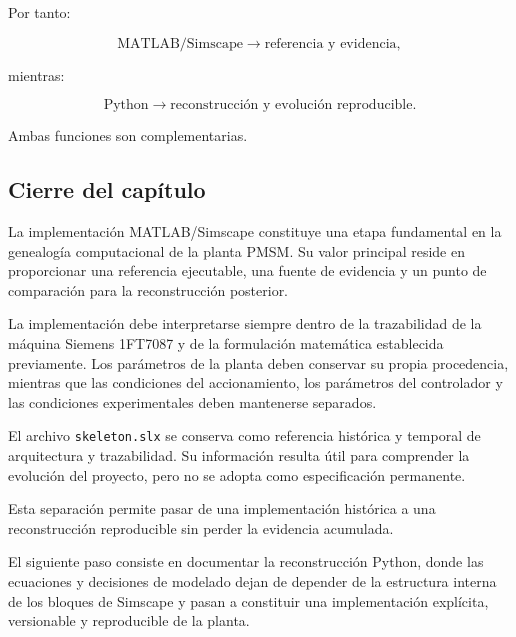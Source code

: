 Por tanto:

\begin{equation}
\text{MATLAB/Simscape}
\rightarrow
\text{referencia y evidencia},
\end{equation}

mientras:

\begin{equation}
\text{Python}
\rightarrow
\text{reconstrucción y evolución reproducible}.
\end{equation}

Ambas funciones son complementarias.

\subsection{Cierre del capítulo}

La implementación MATLAB/Simscape constituye una etapa fundamental en la genealogía computacional de la planta PMSM. Su valor principal reside en proporcionar una referencia ejecutable, una fuente de evidencia y un punto de comparación para la reconstrucción posterior.

La implementación debe interpretarse siempre dentro de la trazabilidad de la máquina Siemens 1FT7087 y de la formulación matemática establecida previamente. Los parámetros de la planta deben conservar su propia procedencia, mientras que las condiciones del accionamiento, los parámetros del controlador y las condiciones experimentales deben mantenerse separados.

El archivo \texttt{skeleton.slx} se conserva como referencia histórica y temporal de arquitectura y trazabilidad. Su información resulta útil para comprender la evolución del proyecto, pero no se adopta como especificación permanente.

Esta separación permite pasar de una implementación histórica a una reconstrucción reproducible sin perder la evidencia acumulada.

El siguiente paso consiste en documentar la reconstrucción Python, donde las ecuaciones y decisiones de modelado dejan de depender de la estructura interna de los bloques de Simscape y pasan a constituir una implementación explícita, versionable y reproducible de la planta.
